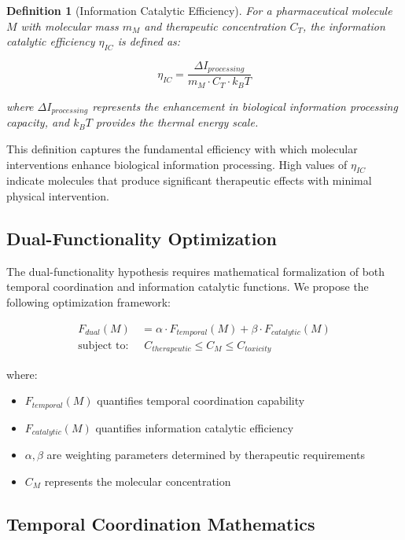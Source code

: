 \documentclass[12pt,a4paper]{article}
\newtheorem{definition}[theorem]{Definition}
\begin{document}
\begin{definition}[Information Catalytic Efficiency]
For a pharmaceutical molecule $M$ with molecular mass $m_M$ and therapeutic concentration $C_T$, the information catalytic efficiency $\eta_{IC}$ is defined as:

$$\eta_{IC} = \frac{\Delta I_{processing}}{m_M \cdot C_T \cdot k_B T}$$

where $\Delta I_{processing}$ represents the enhancement in biological information processing capacity, and $k_B T$ provides the thermal energy scale.
\end{definition}

This definition captures the fundamental efficiency with which molecular interventions enhance biological information processing. High values of $\eta_{IC}$ indicate molecules that produce significant therapeutic effects with minimal physical intervention.

\subsection{Dual-Functionality Optimization}

The dual-functionality hypothesis requires mathematical formalization of both temporal coordination and information catalytic functions. We propose the following optimization framework:

\begin{align}
F_{dual}(M) &= \alpha \cdot F_{temporal}(M) + \beta \cdot F_{catalytic}(M) \label{eq:dual_function}\\
\text{subject to: } &\; C_{therapeutic} \leq C_M \leq C_{toxicity} \label{eq:concentration_constraint}
\end{align}

where:
\begin{itemize}
\item $F_{temporal}(M)$ quantifies temporal coordination capability
\item $F_{catalytic}(M)$ quantifies information catalytic efficiency  
\item $\alpha, \beta$ are weighting parameters determined by therapeutic requirements
\item $C_M$ represents the molecular concentration
\end{itemize}

\subsection{Temporal Coordination Mathematics}
\end{document}
